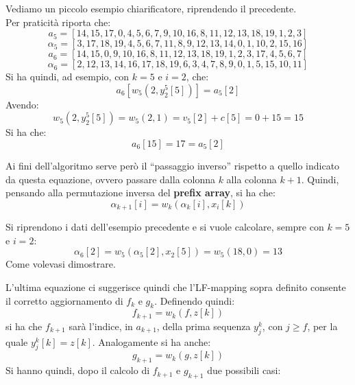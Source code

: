 \begin{esempio}
  Vediamo un piccolo esempio chiarificatore, riprendendo il precedente.\\
  Per praticità riporta che:
  \[a_5=[14,15,17,0,4,5,6,7,9,10,16,8,11,12,13,18,19,1,2,3]\]
  \[\alpha_5=[3,17,18,19,4,5,6,7,11,8,9,12,13,14,0,1,10,2,15,16]\]
  \[a_6=[14,15,0,9,10,16,8,11,12,13,18,19,1,2,3,17,4,5,6,7]\]
  \[\alpha_6=[2,12,13,14,16,17,18,19,6,3,4,7,8,9,0,1,5,15,10,11]\]
  Si ha quindi, ad esempio, con $k=5$ e $i=2$, che:
  \[a_{6}\left[w_5\left(2,y_2^5[5]\right)\right]=a_5[2]\]
  Avendo:
  \[w_5\left(2,y_2^5[5]\right)=w_5\left(2,1\right)=v_5[2]+c[5]=0+15=15\]
  Si ha che:
  \[a_{6}[15]=17=a_5[2]\]
\end{esempio}
Ai fini dell'algoritmo serve però il ``passaggio inverso'' rispetto a quello
indicato da questa equazione, ovvero passare dalla colonna $k$ alla colonna
$k+1$. Quindi, pensando alla permutazione inversa del \textbf{prefix array}, si
ha che:
\[\alpha_{k+1}[i]=w_k(\alpha_k[i],x_i[k])\]
\begin{esempio}
  Si riprendono i dati dell'esempio precedente e si vuole calcolare, sempre con
  $k=5$ e $i=2$:
  \[\alpha_{6}[2]=w_5(\alpha_5[2],x_2[5])=w_5(18,0)=13\]
  Come volevasi dimostrare.
\end{esempio}
L'ultima equazione ci suggerisce quindi che l'LF-mapping sopra definito
consente il corretto aggiornamento di $f_k$ e $g_k$.
Definendo quindi:
\[f_{k+1}=w_k(f,z[k])\]
si ha che $f_{k+1}$ sarà l'indice, in $a_{k+1}$, della prima sequenza $y_j^k$,
con $j\geq f$, per la quale $y_j^k[k]=z[k]$. Analogamente si ha anche:
\[g_{k+1}=w_k(g,z[k])\]
Si hanno quindi, dopo il calcolo di $f_{k+1}$ e $g_{k+1}$ due possibili casi:
